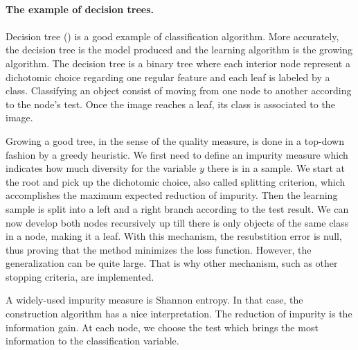 \documentclass[a4paper]{report}
\newlength{\larg}
\begin{document}
\begin{leftbar}
	\paragraph{The example of decision trees.}
	\paragraph{}
	Decision tree (\cite{decisiontrees}) is a good example of classification algorithm. More accurately, the decision tree is the model produced and the learning algorithm is the growing algorithm. The decision tree is a binary tree where each interior node represent a dichotomic choice regarding one regular feature and each leaf is labeled by a class. Classifying an object consist of moving from one node to another according to the node's test. Once the image reaches a leaf, its class is associated to the image.
	\par
	Growing a good tree, in the sense of the quality measure, is done in a top-down fashion by a greedy heuristic. We first need to define an impurity measure which indicates how much diversity for the variable $y$ there is in a sample. We start at the root and pick up the dichotomic choice, also called splitting criterion, which accomplishes the maximum expected reduction of impurity. Then the learning sample is split into a left and a right branch according to the test result. We can now develop both nodes recursively up till there is only objects of the same class in a node, making it a leaf. With this mechanism, the resubstition error is null, thus proving that the method minimizes the loss function. However, the generalization can be quite large. That is why other mechanism, such as other stopping criteria, are implemented.
	\par
	A widely-used impurity measure is Shannon entropy. In that case, the construction algorithm has a nice interpretation. The reduction of impurity is the information gain. At each node, we choose the test which brings the most information to the classification variable.
\end{leftbar}
\end{document}
